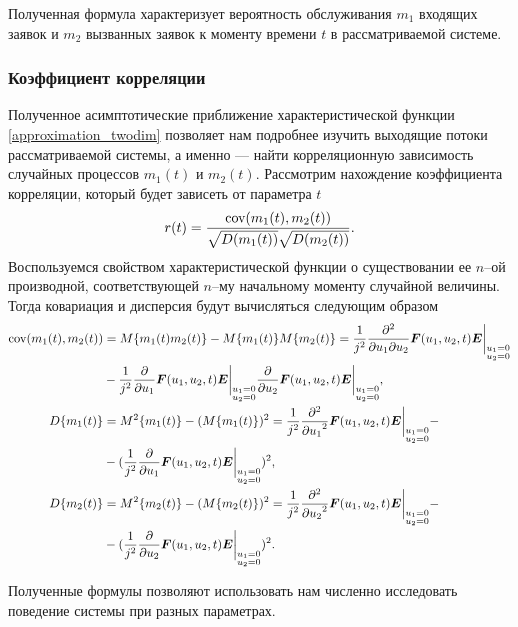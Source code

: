 Полученная формула характеризует вероятность обслуживания $m_{1}$ входящих заявок и $m_{2}$ вызванных заявок к моменту времени $t$ в рассматриваемой системе.

\subsubsection{Коэффициент корреляции} \label{corr_section}
Полученное асимптотические приближение характеристической функции \eqref{approximation_twodim} позволяет нам подробнее изучить выходящие потоки рассматриваемой системы, а именно --- найти корреляционную зависимость случайных процессов $m_{1}(t)$ и $m_{2}(t)$.
Рассмотрим нахождение коэффициента корреляции, который будет зависеть от параметра $t$
\begin{equation*}
	r(t) = \frac{\textnormal{cov}(m_{1}(t),m_{2}(t))}{\sqrt{D(m_{1}(t))}\sqrt{D(m_{2}(t))}}.
\end{equation*}
Воспользуемся свойством характеристической функции о существовании ее $n$--ой производной, соответствующей $n$--му начальному моменту случайной величины. Тогда ковариация и дисперсия будут вычисляться следующим образом
\begin{equation*} %
	\begin{split}
		\textnormal{cov}(m_{1}(t),m_{2}(t)) &= M\{m_{1}(t)m_{2}(t)\} - M\{m_{1}(t)\}M\{m_{2}(t)\} = \frac{1}{j^{2}}\frac{{\partial}^{2}}{{\partial u_{1}}{\partial u_{2}}}\boldsymbol{F}(u_{1},u_{2},t)\boldsymbol{E} \bigg\rvert_{\substack{u_{1} = 0 \\ u_{2} = 0}}  \\ &- \frac{1}{j^{2}} \frac{{\partial}}{{\partial u_{1}}} \boldsymbol{F}(u_{1},u_{2},t)\boldsymbol{E} \bigg\rvert_{\substack{u_{1} = 0 \\ u_{2} = 0}} \frac{{\partial}}{{\partial u_{2}}} \boldsymbol{F}(u_{1},u_{2},t)\boldsymbol{E} \bigg\rvert_{\substack{u_{1} = 0 \\ u_{2} = 0}},
		\\
		D\{m_{1}(t)\} &= M^{2}\{m_{1}(t)\} - (M\{m_{1}(t)\})^{2} = \frac{1}{j^{2}}\frac{{\partial}^{2}}{{\partial u_{1}}^{2}}\boldsymbol{F}(u_{1},u_{2},t)\boldsymbol{E} \bigg\rvert_{\substack{u_{1} = 0 \\ u_{2} = 0}}  - \\ &- (\frac{1}{j^{2}} \frac{{\partial}}{{\partial u_{1}}} \boldsymbol{F}(u_{1},u_{2},t)\boldsymbol{E} \bigg\rvert_{\substack{u_{1} = 0 \\ u_{2} = 0}})^{2},
		\\
		D\{m_{2}(t)\} &= M^{2}\{m_{2}(t)\} - (M\{m_{2}(t)\})^{2} = \frac{1}{j^{2}}\frac{{\partial}^{2}}{{\partial u_{2}}^{2}}\boldsymbol{F}(u_{1},u_{2},t)\boldsymbol{E} \bigg\rvert_{\substack{u_{1} = 0 \\ u_{2} = 0}}  - \\ &- (\frac{1}{j^{2}} \frac{{\partial}}{{\partial u_{2}}} \boldsymbol{F}(u_{1},u_{2},t)\boldsymbol{E} \bigg\rvert_{\substack{u_{1} = 0 \\ u_{2} = 0}})^{2}.
	\end{split}
\end{equation*}

Полученные формулы позволяют использовать нам численно исследовать поведение системы при разных параметрах.
\clearpage